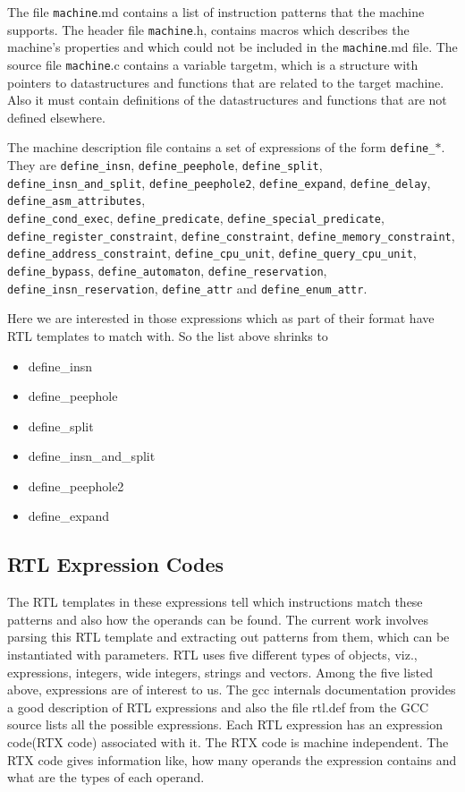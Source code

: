 The file {\tt machine}.md contains a list of instruction patterns that the machine supports. The header file {\tt machine}.h, contains
macros which describes the machine's properties and which could not be included in the {\tt machine}.md file. The source file
{\tt machine}.c contains a variable targetm, which 	is a structure with pointers to datastructures and functions that are related to
the target machine. Also it must contain definitions of the datastructures and functions that are not defined elsewhere.




The machine description file contains a set of expressions of the form {\tt define\_$\ast$}. They are {\tt define\_insn},  
{\tt define\_peephole}, {\tt define\_split}, {\tt define\_insn\_and\_split}, {\tt define\_peephole2}, {\tt define\_expand}, {\tt define\_delay},   
{\tt define\_asm\_attributes}, \\ 
{\tt define\_cond\_exec}, {\tt define\_predicate}, {\tt define\_special\_predicate}, \\
{\tt define\_register\_constraint}, {\tt define\_constraint}, {\tt define\_memory\_constraint}, {\tt define\_address\_constraint}, 
{\tt define\_cpu\_unit}, {\tt define\_query\_cpu\_unit}, \\
{\tt define\_bypass}, {\tt define\_automaton}, {\tt define\_reservation}, \\ {\tt define\_insn\_reservation}, {\tt define\_attr} and {\tt define\_enum\_attr}.
 

                  

Here we are interested in those expressions which as part of their format have RTL templates to match with. So the list above
shrinks to

\begin{itemize}
 \item define\_insn
 \item define\_peephole
 \item define\_split
 \item define\_insn\_and\_split
 \item define\_peephole2
 \item define\_expand
  \end{itemize}


\subsection{RTL Expression Codes}
The RTL templates in these expressions tell which instructions match these patterns and also how the operands can be 
found\cite{gccint}. The current work involves parsing this RTL template and extracting out patterns from them, which can be 
instantiated with parameters. RTL uses five different types of objects, viz., expressions, integers, wide integers, strings and
vectors. Among the five listed above, expressions are of interest to us. The gcc internals documentation provides a good
description of RTL expressions and also the file rtl.def from the GCC source lists all the possible expressions. Each RTL expression
has an expression code(RTX code) associated with it. The RTX code is machine independent. The RTX code gives information like,
how many operands the expression contains and what are the types of each operand.

